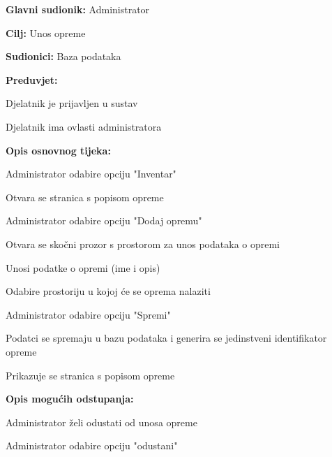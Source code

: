 					
					\noindent {}
					\begin{packed_item}
						
						\item \textbf{Glavni sudionik: }Administrator
						\item  \textbf{Cilj: }Unos opreme
							\item  \textbf{Sudionici: }Baza podataka
							\item  \textbf{Preduvjet: }
							\item[] \begin{packed_enum}
								
								\item[-] Djelatnik je prijavljen u sustav
								\item[-] Djelatnik ima ovlasti administratora
							\end{packed_enum}
							\item  \textbf{Opis osnovnog tijeka: }
							
							\item[] \begin{packed_enum}
								\item Administrator odabire opciju "Inventar"
								\item Otvara se stranica s popisom opreme
								\item Administrator odabire opciju "Dodaj opremu"
								\item Otvara se skočni prozor s prostorom za unos podataka o opremi
								\item Unosi podatke o opremi (ime i opis)
								\item Odabire prostoriju u kojoj će se oprema nalaziti
								\item Administrator odabire opciju "Spremi"
								\item Podatci se spremaju u bazu podataka i generira se jedinstveni identifikator opreme
								\item Prikazuje se stranica s popisom opreme
							\end{packed_enum}
							
							\item  \textbf{Opis mogućih odstupanja:}
							
							\item[] \begin{packed_item}
								
								\item[6.a] Administrator želi odustati od unosa opreme 
								\item[] \begin{packed_enum}
									\item 	Administrator odabire opciju "odustani"			
								\end{packed_enum}
							\end{packed_item}
						\end{packed_item}
				
